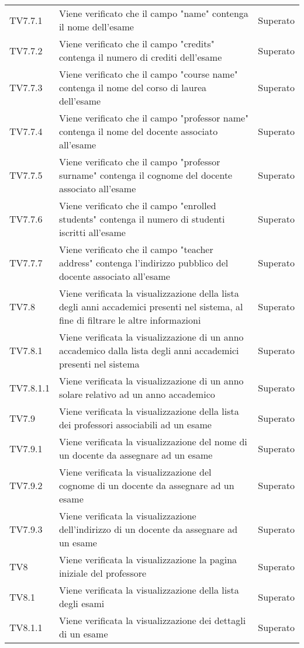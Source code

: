 \documentclass[PianoDiQualifica.tex]{subfiles}
\begin{document}
\begin{longtable}[H]{P{2cm}P{8.5cm}P{3cm}}
	TV7.7.1 & Viene verificato che il campo "name" contenga il nome dell'esame & Superato \\ 
	TV7.7.2 & Viene verificato che il campo "credits" contenga il numero di crediti dell'esame & Superato \\ 
	TV7.7.3 & Viene verificato che il campo "course name" contenga il nome del corso di laurea dell'esame & Superato \\ 
	TV7.7.4 & Viene verificato che il campo "professor name" contenga il nome del docente associato all'esame & Superato \\ 
	TV7.7.5 & Viene verificato che il campo "professor surname" contenga il cognome del docente associato all'esame & Superato \\ 
	TV7.7.6 & Viene verificato che il campo "enrolled students" contenga il numero di studenti iscritti all'esame & Superato \\ 
	TV7.7.7 & Viene verificato che il campo "teacher address" contenga l'indirizzo pubblico del docente associato all'esame & Superato \\ 
	TV7.8 & Viene verificata la visualizzazione della lista degli anni accademici presenti nel sistema, al fine di filtrare le altre informazioni & Superato \\ 
	TV7.8.1 & Viene verificata la visualizzazione di un anno accademico dalla lista degli anni accademici presenti nel sistema & Superato \\ 
	TV7.8.1.1 & Viene verificata la visualizzazione di un anno solare relativo ad un anno accademico & Superato \\ 
	TV7.9 & Viene verificata la visualizzazione della lista dei professori associabili ad un esame & Superato \\
	TV7.9.1 & Viene verificata la visualizzazione del nome di un docente da assegnare ad un esame  & Superato \\
	TV7.9.2 & Viene verificata la visualizzazione del cognome di un docente da assegnare ad un esame  
	 & Superato \\
	TV7.9.3 & Viene verificata la visualizzazione dell'indirizzo di un docente da assegnare ad un esame & Superato \\
	TV8 & Viene verificata la visualizzazione la pagina iniziale del professore & Superato \\
	TV8.1 & Viene verificata la visualizzazione della lista degli esami
	 & Superato \\
	TV8.1.1 & Viene verificata la visualizzazione dei dettagli di un esame & Superato \\

\end{longtable}
\end{document}
